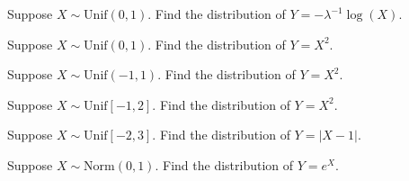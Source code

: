\documentclass[addpoints,12pt]{exam}
\begin{document}
\begin{questions}
\addpoints


\question[1] Suppose $X\sim \text{Unif}(0,1)$. Find the distribution of $Y=-\lambda^{-1}\log(X)$.

\vspace{1.9in}

\question[2] Suppose $X\sim \text{Unif}(0,1)$. Find the distribution of $Y=X^2$.

\vspace{1.7in}

 \question[2] Suppose $X\sim \text{Unif}(-1,1)$. Find the distribution of $Y=X^2$.

\vspace{1.7in}

\newpage
 \question[2] Suppose $X\sim \text{Unif}[-1,2]$. Find the distribution of $Y=X^2$.

\vspace{1.9in}

 \question[2] Suppose $X\sim \text{Unif}[-2,3]$. Find the distribution of $Y=|X-1|$.

\vspace{1.9in}

 \question[3] Suppose $X\sim \text{Norm}(0,1)$. Find the distribution of $Y=e^X$.

\vspace{1.7in}

\end{questions}
\end{document}
